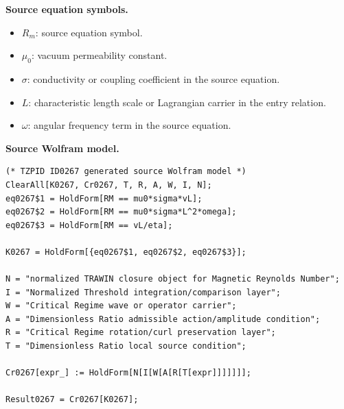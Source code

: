 \begin{minipage}[t]{0.49\linewidth}
\begingroup
\small
\raggedright
\textbf{Source equation symbols.}\par
\begin{itemize}[leftmargin=1.35em,itemsep=1pt,topsep=1pt,parsep=0pt]
    \item $R_m$: source equation symbol.
    \item $\mu_0$: vacuum permeability constant.
    \item $\sigma$: conductivity or coupling coefficient in the source equation.
    \item $L$: characteristic length scale or Lagrangian carrier in the entry relation.
    \item $\omega$: angular frequency term in the source equation.
\end{itemize}
\endgroup
\end{minipage}\hfill
\begin{minipage}[t]{0.47\linewidth}
\begingroup
\scriptsize
\raggedright
\textbf{Source Wolfram model.}\par
\begin{Verbatim}[fontsize=\tiny,breaklines=true,breakanywhere=true]
(* TZPID ID0267 generated source Wolfram model *)
ClearAll[K0267, Cr0267, T, R, A, W, I, N];
eq0267$1 = HoldForm[RM == mu0*sigma*vL];
eq0267$2 = HoldForm[RM == mu0*sigma*L^2*omega];
eq0267$3 = HoldForm[RM == vL/eta];

K0267 = HoldForm[{eq0267$1, eq0267$2, eq0267$3}];

N = "normalized TRAWIN closure object for Magnetic Reynolds Number";
I = "Normalized Threshold integration/comparison layer";
W = "Critical Regime wave or operator carrier";
A = "Dimensionless Ratio admissible action/amplitude condition";
R = "Critical Regime rotation/curl preservation layer";
T = "Dimensionless Ratio local source condition";

Cr0267[expr_] := HoldForm[N[I[W[A[R[T[expr]]]]]]];

Result0267 = Cr0267[K0267];
\end{Verbatim}
\endgroup
\end{minipage}

